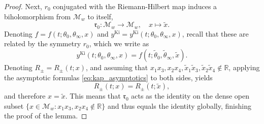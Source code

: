 \documentclass[a4paper,reqno]{amsart}
\numberwithin{equation}{section}
\numberwithin{equation}{section}
\begin{document}
\begin{proof}
Next, $r_0$ conjugated with the Riemann-Hilbert map induces a biholomorphism from $\mathcal{M}_w$ to itself,
\begin{equation*}
    \mathfrak{r}_0:\mathcal{M}_w\rightarrow \mathcal{M}_w, \quad x\mapsto \widetilde{x}.
\end{equation*}
Denoting $f=f(t;\theta_0,\theta_\infty,x)$ and $y^{\text{Ki}}=y^{\text{Ki}}(t;\theta_0,\theta_\infty,x)$, recall that these are related by the symmetry $r_0$, which we write as
\begin{equation*}
    y^{\text{Ki}}(t;\theta_0,\theta_\infty,x)=f(t;\widetilde{\theta}_0,\widetilde{\theta}_\infty,\widetilde{x}).
\end{equation*}
Denoting $R_\pm=R_\pm(t;x)$, and assuming that $ x_1x_3,x_2x_4,\widetilde{x}_1\widetilde{x}_3,\widetilde{x}_2\widetilde{x}_4\notin \mathbb{R}$, applying the asymptotic formulas \eqref{eq:kap_asymptotics} to both sides, yields
\begin{equation*}
    R_\pm(t;x)=R_\pm(t;\widetilde{x}),
\end{equation*}
and therefore $x=\widetilde{x}$. This means that $\mathfrak{r}_0$ acts as the identity on the dense open subset $\{x\in\mathcal{M}_w: x_1x_3,x_2x_4\notin \mathbb{R}\}$ and thus equals the identity globally, finishing the proof of the lemma.
\end{proof}
\end{document}
